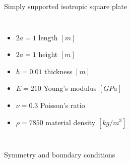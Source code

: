 \documentclass[aspectratio=169]{beamer}
\begin{document}
\begin{frame}{Simply supported isotropic square plate}
\begin{columns}
    {\begin{itemize}\setlength\itemsep{0.05em}
        \item $2a=1$ length $[m]$
        \item $2a=1$ height $[m]$
        \item $h=0.01$ thickness $[m]$
        \item $E=210$ Young's modulus $[GPa]$
        \item $\nu=0.3$ Poisson's ratio
        \item $\rho=7850$ material density $[kg/m^3]$
      \end{itemize}}
  \end{columns}
\end{frame}

\begin{frame}{Symmetry and boundary conditions}


\end{frame}
\end{document}
